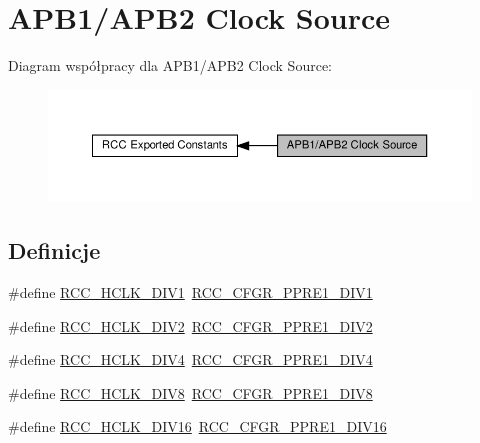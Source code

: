 \hypertarget{group___r_c_c___a_p_b1___a_p_b2___clock___source}{}\section{A\+P\+B1/\+A\+P\+B2 Clock Source}
\label{group___r_c_c___a_p_b1___a_p_b2___clock___source}
Diagram współpracy dla A\+P\+B1/\+A\+P\+B2 Clock Source\+:\nopagebreak
\begin{figure}[H]
\begin{center}
\leavevmode
\includegraphics[width=350pt]{group___r_c_c___a_p_b1___a_p_b2___clock___source}
\end{center}
\end{figure}
\subsection*{Definicje}
\begin{DoxyCompactItemize}
\item 
\#define \hyperlink{group___r_c_c___a_p_b1___a_p_b2___clock___source_ga8e3fcdef0e5d77bb61a52420fe1e9fbc}{R\+C\+C\+\_\+\+H\+C\+L\+K\+\_\+\+D\+I\+V1}~\hyperlink{group___peripheral___registers___bits___definition_gac8f6562bb2ecf65055a2f42cbb48ef11}{R\+C\+C\+\_\+\+C\+F\+G\+R\+\_\+\+P\+P\+R\+E1\+\_\+\+D\+I\+V1}
\item 
\#define \hyperlink{group___r_c_c___a_p_b1___a_p_b2___clock___source_ga4d2ebcf280d85e8449a5fb7b994b5169}{R\+C\+C\+\_\+\+H\+C\+L\+K\+\_\+\+D\+I\+V2}~\hyperlink{group___peripheral___registers___bits___definition_gaf832ad6844c907d9bb37c1536defcb0d}{R\+C\+C\+\_\+\+C\+F\+G\+R\+\_\+\+P\+P\+R\+E1\+\_\+\+D\+I\+V2}
\item 
\#define \hyperlink{group___r_c_c___a_p_b1___a_p_b2___clock___source_ga85b5f4fd936e22a3f4df5ed756f6e083}{R\+C\+C\+\_\+\+H\+C\+L\+K\+\_\+\+D\+I\+V4}~\hyperlink{group___peripheral___registers___bits___definition_ga0e340725f46e9462d9b02a079b9fa8ae}{R\+C\+C\+\_\+\+C\+F\+G\+R\+\_\+\+P\+P\+R\+E1\+\_\+\+D\+I\+V4}
\item 
\#define \hyperlink{group___r_c_c___a_p_b1___a_p_b2___clock___source_gadb18bc60e2c639cb59244bedb54f7bb3}{R\+C\+C\+\_\+\+H\+C\+L\+K\+\_\+\+D\+I\+V8}~\hyperlink{group___peripheral___registers___bits___definition_ga9ddd6d657837e1971bb86e3bf1c15e72}{R\+C\+C\+\_\+\+C\+F\+G\+R\+\_\+\+P\+P\+R\+E1\+\_\+\+D\+I\+V8}
\item 
\#define \hyperlink{group___r_c_c___a_p_b1___a_p_b2___clock___source_ga27ac27d48360121bc2dc68b99dc8845d}{R\+C\+C\+\_\+\+H\+C\+L\+K\+\_\+\+D\+I\+V16}~\hyperlink{group___peripheral___registers___bits___definition_ga5c38ba326bde7c7a18c4f7f2aacf823f}{R\+C\+C\+\_\+\+C\+F\+G\+R\+\_\+\+P\+P\+R\+E1\+\_\+\+D\+I\+V16}
\end{DoxyCompactItemize}


